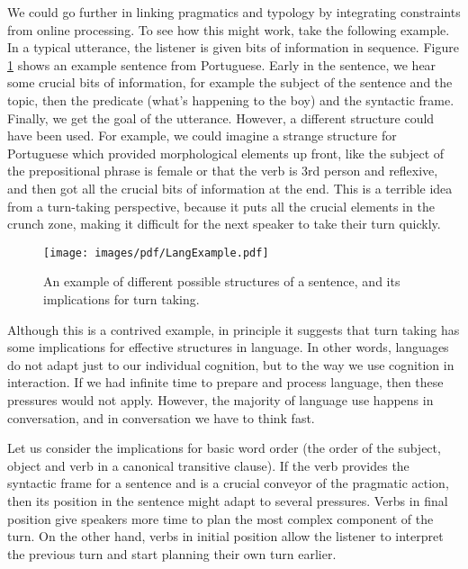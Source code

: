\documentclass[12pt]{article}
\begin{document}

We could go further in linking pragmatics and typology by integrating constraints from online processing.  To see how this might work, take the following example.  In a typical utterance, the listener is given bits of information in sequence.  Figure \ref{fig:langExample} shows an example sentence from Portuguese.  Early in the sentence, we hear some crucial bits of information, for example the subject of the sentence and the topic, then the predicate (what's happening to the boy) and the syntactic frame.  Finally, we get the goal of the utterance.  However, a different structure could have been used.  For example, we could imagine a strange structure for Portuguese which provided morphological elements up front, like the subject of the prepositional phrase is female or that the verb is 3rd person and reflexive, and then got all the crucial bits of information at the end.  This is a terrible idea from a turn-taking perspective, because it puts all the crucial elements in the crunch zone, making it difficult for the next speaker to take their turn quickly.

\begin{figure}[htbp]
\begin{center}
\texttt{[image: images/pdf/LangExample.pdf]}
\caption{An example of different possible structures of a sentence, and its implications for turn taking.}
\label{fig:langExample}
\end{center}
\end{figure}

Although this is a contrived example, in principle it suggests that turn taking has some implications for effective structures in language.  In other words, languages do not adapt just to our individual cognition, but to the way we use cognition in interaction.  If we had infinite time to prepare and process language, then these pressures would not apply.
However, the majority of language use happens in conversation, and in conversation we have to think fast.

Let us consider the implications for basic word order (the order of the subject, object and verb in a canonical transitive clause).  If the verb provides the syntactic frame for a sentence and is a crucial conveyor of the pragmatic action, then its position in the sentence might adapt to several pressures. Verbs in final position give speakers more time to plan the most complex component of the turn.  On the other hand, verbs in initial position allow the listener to interpret the previous turn and start planning their own turn earlier. 
\end{document}

